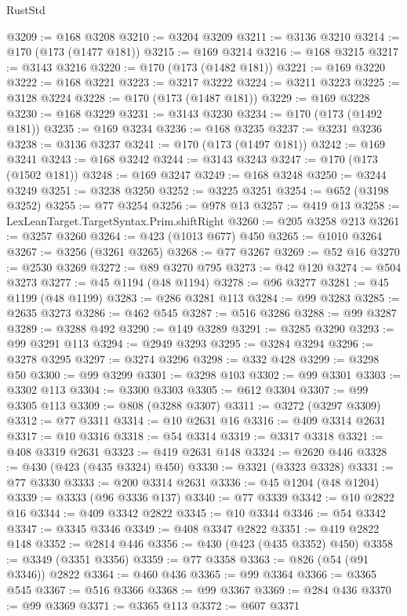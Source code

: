 \begin{lexlean}{RustStd}
\begin{coremodule}
@3209 := @168 @3208
@3210 := @3204 @3209
@3211 := @3136 @3210
@3214 := @170 (@173 (@1477 @181))
@3215 := @169 @3214
@3216 := @168 @3215
@3217 := @3143 @3216
@3220 := @170 (@173 (@1482 @181))
@3221 := @169 @3220
@3222 := @168 @3221
@3223 := @3217 @3222
@3224 := @3211 @3223
@3225 := @3128 @3224
@3228 := @170 (@173 (@1487 @181))
@3229 := @169 @3228
@3230 := @168 @3229
@3231 := @3143 @3230
@3234 := @170 (@173 (@1492 @181))
@3235 := @169 @3234
@3236 := @168 @3235
@3237 := @3231 @3236
@3238 := @3136 @3237
@3241 := @170 (@173 (@1497 @181))
@3242 := @169 @3241
@3243 := @168 @3242
@3244 := @3143 @3243
@3247 := @170 (@173 (@1502 @181))
@3248 := @169 @3247
@3249 := @168 @3248
@3250 := @3244 @3249
@3251 := @3238 @3250
@3252 := @3225 @3251
@3254 := @652 (@3198 @3252)
@3255 := @77 @3254
@3256 := @978 @13
@3257 := @419 @13
@3258 := LexLeanTarget.TargetSyntax.Prim.shiftRight
@3260 := @205 @3258 @213
@3261 := @3257 @3260
@3264 := @423 (@1013 @677) @450
@3265 := @1010 @3264
@3267 := @3256 (@3261 @3265)
@3268 := @77 @3267
@3269 := @52 @16
@3270 := @2530 @3269
@3272 := @89 @3270 @795
@3273 := @42 @120
@3274 := @504 @3273
@3277 := @45 @1194 (@48 @1194)
@3278 := @96 @3277
@3281 := @45 @1199 (@48 @1199)
@3283 := @286 @3281 @113
@3284 := @99 @3283
@3285 := @2635 @3273
@3286 := @462 @545
@3287 := @516 @3286
@3288 := @99 @3287
@3289 := @3288 @492
@3290 := @149 @3289
@3291 := @3285 @3290
@3293 := @99 @3291 @113
@3294 := @2949 @3293
@3295 := @3284 @3294
@3296 := @3278 @3295
@3297 := @3274 @3296
@3298 := @332 @428
@3299 := @3298 @50
@3300 := @99 @3299
@3301 := @3298 @103
@3302 := @99 @3301
@3303 := @3302 @113
@3304 := @3300 @3303
@3305 := @612 @3304
@3307 := @99 @3305 @113
@3309 := @808 (@3288 @3307)
@3311 := @3272 (@3297 @3309)
@3312 := @77 @3311
@3314 := @10 @2631 @16
@3316 := @409 @3314 @2631
@3317 := @10 @3316
@3318 := @54 @3314
@3319 := @3317 @3318
@3321 := @408 @3319 @2631
@3323 := @419 @2631 @148
@3324 := @2620 @446
@3328 := @430 (@423 (@435 @3324) @450)
@3330 := @3321 (@3323 @3328)
@3331 := @77 @3330
@3333 := @200 @3314 @2631
@3336 := @45 @1204 (@48 @1204)
@3339 := @3333 (@96 @3336 @137)
@3340 := @77 @3339
@3342 := @10 @2822 @16
@3344 := @409 @3342 @2822
@3345 := @10 @3344
@3346 := @54 @3342
@3347 := @3345 @3346
@3349 := @408 @3347 @2822
@3351 := @419 @2822 @148
@3352 := @2814 @446
@3356 := @430 (@423 (@435 @3352) @450)
@3358 := @3349 (@3351 @3356)
@3359 := @77 @3358
@3363 := @826 (@54 (@91 @3346)) @2822
@3364 := @460 @436
@3365 := @99 @3364
@3366 := @3365 @545
@3367 := @516 @3366
@3368 := @99 @3367
@3369 := @284 @436
@3370 := @99 @3369
@3371 := @3365 @113
@3372 := @607 @3371

\end{coremodule}
\end{lexlean}
